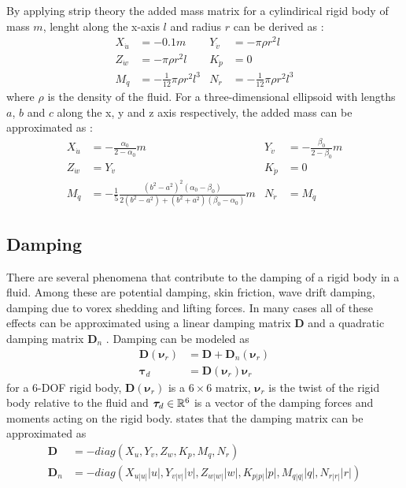 By applying strip theory the added mass matrix for a cylindirical rigid body of
mass $m$, lenght along the x-axis $l$ and radius $r$ can be derived as \cite{fossen1994}:
\begin{align}
 X_{\dot{u}} &= -0.1 m &
 Y_{\dot{v}} &= -\pi \rho r^2 l \nonumber \\
 Z_{\dot{w}} &= -\pi \rho r^2 l &
 K_{\dot{p}} &= 0 \\
 M_{\dot{q}} &= -\frac{1}{12} \pi \rho r^2 l^3 &
 N_{\dot{r}} &= -\frac{1}{12} \pi \rho r^2 l^3 \nonumber
\end{align}
where $\rho$ is the density of the fluid. For a three-dimensional ellipsoid with
lengths $a$, $b$ and $c$ along the x, y and z axis respectively, the added mass
can be approximated as \cite{fossen2021}:
\begin{align}
 X_{\dot{u}} &= -\frac{\alpha_0}{2-\alpha_0}m &
 Y_{\dot{v}} &= -\frac{\beta_0}{2-\beta_0}m \nonumber \\
 Z_{\dot{w}} &= Y_{\dot{v}}&
 K_{\dot{p}} &= 0 \\
 M_{\dot{q}} &= -\frac{1}{5}\frac{(b^2-a^2)^2(\alpha_0-\beta_0)}{2(b^2-a^2) + (b^2+a^2)(\beta_0-\alpha_0)}m&
 N_{\dot{r}} &= M_{\dot{q}} \nonumber
\end{align}

\subsection{Damping}

There are several phenomena that contribute to the damping of a rigid body in
a fluid. Among these are potential damping, skin friction, wave drift damping,
damping due to vorex shedding and lifting forces. In many cases
all of these effects can be approximated using a linear damping matrix $\bm{D}$ and
a quadratic damping matrix $\bm{D}_n$ \cite{fossen2021}. Damping can be modeled
as
\begin{align}
    \bm{D}(\bm{\nu}_r) &= \bm{D} + \bm{D}_n(\bm{\nu}_r) \\
    \bm{\tau}_d &= \bm{D}(\bm{\nu}_r)\bm{\nu}_r
\end{align}
for a 6-DOF rigid body, $\bm{D}(\bm{\nu}_r)$ is a $6\times 6$ matrix, $\bm{\nu}_r$
is the twist of the rigid body relative to the fluid and $\bm{\tau}_d \in \mathbb{R}^6$
is a vector of the damping forces and moments acting on the rigid body. \cite{antonelli2018}
states that the damping matrix can be approximated as
\begin{subequations}
\begin{align}
    \bm{D} &= -diag(X_u, Y_v, Z_w, K_p, M_q, N_r) \\
    \bm{D}_n &= -diag(X_{u|u|}|u|, Y_{v|v|}|v|, Z_{w|w|}|w|, K_{p|p|}|p|, M_{q|q|}|q|, N_{r|r|}|r|)
\end{align}
\end{subequations}

